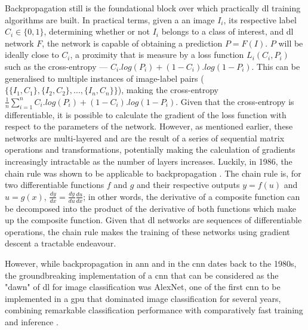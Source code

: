 \begin{figure}
	\label{fig:cnn}
\end{figure}

Backpropagation still is the foundational block over which practically \ac{dl} training algorithms are built. In practical terms, given a an image $I_i$, its respective label $C_i \in \{0,1\}$, determining whether or not $I_i$ belongs to a class of interest, and \ac{dl} network $F$, the network is capable of obtaining a prediction $P = F(I)$. $P$ will be ideally close to $C_i$, a proximity that is measure by a loss function $L_i(C_i,P_i)$ such as the cross-entropy --- $C_i.log(P_i) + (1-C_i).log(1-P_i)$. This can be generalised to multiple instances of image-label pairs ($\{\{I_1,C_1\},\{I_2,C_2\},...,\{I_n,C_n\}\}$), making the cross-entropy $\frac{1}{n}\sum_{i=1}^{n}C_i.log(P_i) + (1-C_i).log(1-P_i)$. Given that the cross-entropy is differentiable, it is possible to calculate the gradient of the loss function with respect to the parameters of the network. However, as mentioned earlier, these networks are multi-layered and are the result of a series of sequential matrix operations and transformations, potentially making the calculation of gradients increasingly intractable as the number of layers increases. Luckily, in 1986, the chain rule was shown to be applicable to backpropagation \cite{Rumelhart1986-tl}. The chain rule is, for two differentiable functions $f$ and $g$ and their respective outputs $y = f(u)$ and $u = g(x)$, $\frac{dy}{dx} = \frac{dy}{du}\frac{du}{dx}$; in other words, the derivative of a composite function can be decomposed into the product of the derivative of both functions which make up the composite function. Given that \ac{dl} networks are sequences of differentiable operations, the chain rule makes the training of these networks using gradient descent a tractable endeavour. 

However, while backpropagation in \ac{ann} and in the \ac{cnn} dates back to the 1980s, the groundbreaking implementation of a \ac{cnn} that can be considered as the "dawn" of \ac{dl} for image classification was AlexNet, one of the first \ac{cnn} to be implemented in a \ac{gpu} that dominated image classification for several years, combining remarkable classification performance with comparatively fast training and inference \cite{Krizhevsky2012-by}. 

